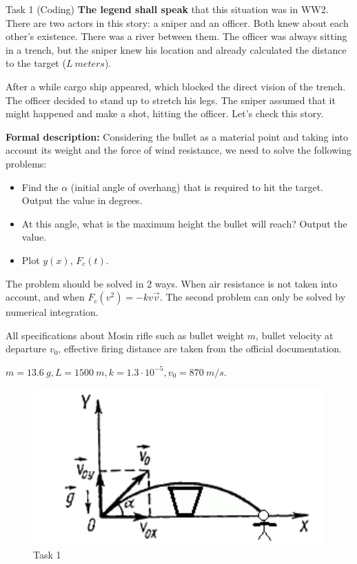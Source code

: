 \documentclass[aspectratio=169]{beamer}
\begin{document}
\begin{frame}[t]{Task 1 (Coding)}
  \vspace*{-0.4cm}
  \scriptsize
\textbf{  The legend shall speak} that this situation was in WW2. There are two actors in this story: a sniper and an officer. Both knew about each other's existence. There was a river between them. The officer was always sitting in a trench, but the sniper knew his location and already calculated the distance to the target ($L\ meters$).

  After a while cargo ship appeared, which blocked the direct vision of the trench. The officer decided to stand up to stretch his legs. The sniper assumed that it might happened and make a shot, hitting the officer. Let's check this story.

\textbf{Formal description:} Considering the bullet as a material point and taking into account its weight and the force of wind resistance, we need to solve the following problems:
  \begin{itemize}
    \item Find the $\alpha$ (initial angle of overhang) that is required to hit the target. Output the value in degrees.
    \item At this angle, what is the maximum height the bullet will reach? Output the value.
    \item Plot $y(x)$, $F_c(t)$.
  \end{itemize}

  \vspace*{-0.3cm}
    \begin{minipage}{0.7\textwidth}    
      The problem should be solved in 2 ways. When air resistance is not taken into account, and when $F_c(v^2)=-kv \vec{v}$. The second problem can only be solved by numerical integration.
      
      All specifications about Mosin rifle such as bullet weight $m$, bullet velocity at departure $v_0$, effective firing distance are taken from the official documentation.
      
      $m=13.6\ g, L=1500\ m, k=1.3 \cdot 10^{-5}, v_0=870\ m/s$.
    \end{minipage}
    \begin{minipage}{0.29\textwidth}
      \vspace*{-0.6cm}
      \begin{figure}[H]
        \centering\includegraphics[height=6cm,width=1\textwidth,keepaspectratio]{HW5_1}
        \caption*{Task 1}
      \end{figure}
    \end{minipage}
  \end{frame}
  
\end{document}
